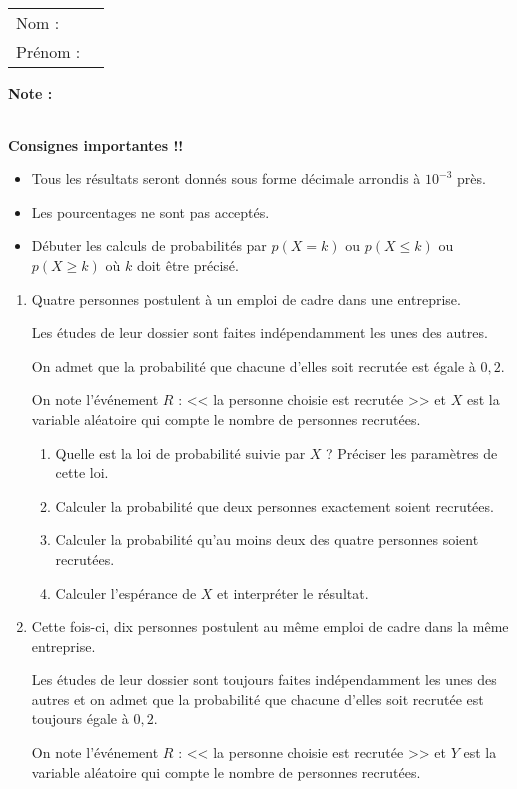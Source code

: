 \documentclass[10pt,french]{book}
\newcommand\competences{
\setcounter{exo}{0}
\begin{tabular}{ll} Nom : \\[5pt] Prénom : \end{tabular}
\hfill
\textbf{Note :}\renewcommand\arraystretch{2.3}
\begin{tabularx}{0.18\linewidth}{|X|}
\hline
\slashbox{\Huge\bfseries\phantom{10}}{\Huge\bfseries 10}\\
\hline
\end{tabularx}\renewcommand\arraystretch{1}\medskip
}
\begin{document}
\competences\bigskip

{\bfseries
    Consignes importantes !!\par
        \begin{itemize}
            \item Tous les résultats seront donnés sous forme décimale arrondis à $10^{-3}$ près.
            \item Les pourcentages ne sont pas acceptés.
            \item Débuter les calculs de probabilités par $p(X = k)$ ou $p(X \leq k)$ ou $p(X \geq k)$ où $k$ doit être précisé.
        \end{itemize}
}\medskip

\begin{enumerate}
    \item Quatre personnes postulent à un emploi de cadre dans une entreprise.\par Les études de leur dossier sont faites indépendamment les unes des autres.\par On admet que la probabilité que chacune d'elles soit recrutée est égale à $0,2$.\par
        On note l'événement $R$ : << la personne choisie est recrutée >> et $X$ est la variable aléatoire qui compte le nombre de personnes recrutées.

        \begin{enumerate}
            \item Quelle est la loi de probabilité suivie par $X$ ? Préciser les paramètres de cette loi.
            \item Calculer la probabilité que deux personnes exactement soient recrutées.
            \item Calculer la probabilité qu'au moins deux des quatre personnes soient recrutées.
            \item Calculer l'espérance de $X$ et interpréter le résultat.
        \end{enumerate}
        
    \item Cette fois-ci, dix personnes postulent au même emploi de cadre dans la même entreprise. \par Les études de leur dossier sont toujours faites indépendamment les unes des autres et on admet que la probabilité que chacune d'elles soit recrutée est toujours égale à $0,2$.\par
        On note l'événement $R$ : << la personne choisie est recrutée >> et $Y$ est la variable aléatoire qui compte le nombre de personnes recrutées.
        

\end{enumerate}
\end{document}
